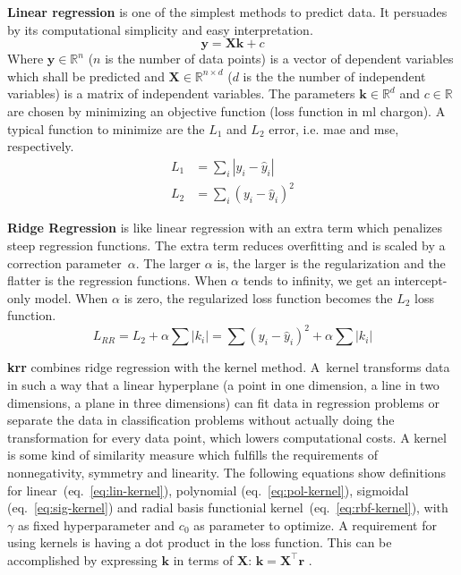 %
\textbf{Linear regression} is one of the simplest methods to predict data. 
It persuades by its computational simplicity and easy interpretation. 
\begin{equation}
\mathbf{y} = \mathbf{X} \mathbf{k} +c 
\end{equation}
Where $\mathbf{y} \in \mathbb{R}^n$ ($n$ is the number of data points) is a vector of dependent variables which shall be predicted and $\mathbf{X}\in \mathbb{R}^{n\times d}$ ($d$ is the the number of independent variables) is a matrix of independent variables. 
The parameters $\mathbf{k} \in \mathbb{R}^d$ and $c \in \mathbb{R}$ are chosen by minimizing an objective function (loss function in \gls{ml} chargon).
A typical function to minimize are the $L_1$ and $L_2$ error, i.e. \gls{mae} and \gls{mse}, respectively.
\begin{align}
L_1&= \sum_i |y_i - \hat y_i| \\%
L_2&= \sum_i(y_i - \hat y_i)^2 %
\end{align}
%

\textbf{Ridge Regression} is like linear regression with an extra term which penalizes steep regression functions.
The extra term reduces overfitting and is scaled by a correction parameter~$\alpha$. 
The larger $\alpha$ is, the larger is the regularization and the flatter is the regression functions. 
When $\alpha$ tends to infinity, we get an intercept-only model.
When $\alpha$ is zero, the regularized loss function becomes the $L_2$ loss function.
\begin{equation}
    L_{RR} = L_2 + \alpha \sum |k_i| = \sum(y_i - \hat y_i)^2 + \alpha \sum |k_i| 
\end{equation}

\textbf{\Gls{krr}} combines ridge regression with the kernel method. 
A~kernel transforms data in such a way that a linear hyperplane (a point in one dimension, a line in two dimensions, 
a plane in three dimensions) can fit data in regression problems or separate the data in classification problems without actually doing the transformation for every data point, which lowers computational costs.
A kernel is some kind of similarity measure 
which fulfills the requirements of nonnegativity, symmetry and linearity\cite{rupp2015machine}.
The following equations show definitions for 
linear~(eq.~\ref{eq:lin-kernel}), 
polynomial (eq.~\ref{eq:pol-kernel}), 
sigmoidal (eq.~\ref{eq:sig-kernel}) and 
radial basis functionial kernel~(eq.~\ref{eq:rbf-kernel}), with $\gamma$ as fixed hyperparameter and $c_0$ as parameter to optimize.
A requirement for using kernels is having a dot product in the loss function. 
This can be accomplished by expressing $\mathbf{k}$ in terms of $\mathbf{X}$: $\mathbf{k}=\mathbf{X}^\top \mathbf{r}$
\cite{rudin2020least}.

